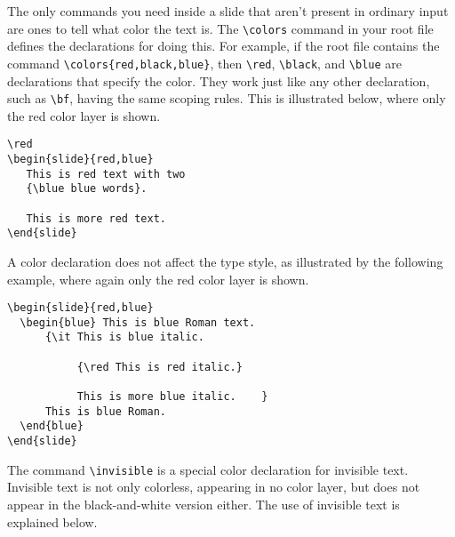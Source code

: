 The only commands you need inside a slide that aren't present in
ordinary \LATEX{} input are ones to tell \SLITEX{} what color the text
is.  The \xsp{}\hbox{\verb"\colors"}\xsp{} command in your root file
defines the declarations  for doing this.
For example, if the root file contains the command
\xsp{}\hbox{\verb"\colors{red,black,blue}"}\Xsp,
then \xsp{}\hbox{\verb"\red"}\Xsp, \xsp{}\hbox{\verb"\black"}\Xsp, and
\xsp{}\hbox{\verb"\blue"}\xsp{} are declarations that specify the
color.  They work just like any other declaration, such as
\xsp{}\hbox{\verb"\bf"}\Xsp, having the same scoping rules.  This is
illustrated below, where only the red color layer is shown.
\begin{exambox}
\midbox
\begin{verbatim}
\red
\begin{slide}{red,blue}
   This is red text with two 
   {\blue blue words}.

   This is more red text.
\end{slide}
\end{verbatim}
\end{exambox}
A color declaration does not affect the type style, as illustrated
by the following example, where again only the red color layer is
shown.

\begin{exambox}
\midbox
\begin{verbatim}
\begin{slide}{red,blue}
  \begin{blue} This is blue Roman text.
      {\it This is blue italic.

           {\red This is red italic.}

           This is more blue italic.    }
      This is blue Roman.
  \end{blue}
\end{slide}
\end{verbatim}
\end{exambox}

The command \xsp{}\hbox{\verb"\invisible"}\xsp{} is
a special color declaration for invisible text.  Invisible text is not
only colorless, appearing in no color layer, but does not appear in
the black-and-white version either.  The use of invisible text is
explained below.

